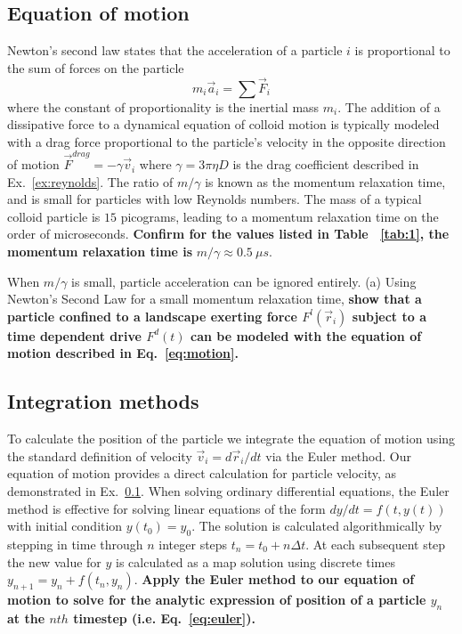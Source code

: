 \documentclass[twocolumn,showpacs,preprintnumbers,amsmath,amssymb,aps,prb]{revtex4}
\begin{document}
\label{ex:reynolds}

\subsection{Equation of motion}
  \label{ex:n2l}
  Newton's second law states that
  the acceleration of a particle $i$
  is proportional to 
  the sum of forces on the particle 
  \begin{equation}
  m_i \vec{a}_i = \sum \vec{F}_i
  \label{eq:n2l}
  \end{equation}
  where the constant of proportionality is the
  inertial mass $m_i$.  
  The addition of a dissipative force to a dynamical equation 
  of colloid motion 
  is typically modeled
  with a drag force proportional to the particle's velocity
  in the opposite direction of motion 
  $\vec{F}^{drag} = - \gamma \vec{v}_i$
  where $\gamma = 3 \pi \eta D$ is the drag coefficient
  described in Ex.~\ref{ex:reynolds}.
  The ratio of $m/\gamma$ is %
  known as the momentum relaxation time, %
  and is small for
  particles with low Reynolds numbers.
  The mass of a
  typical colloid particle is $15$ picograms,
  leading to a momentum relaxation time
  on the order of microseconds.
  {\bf Confirm for the values listed in Table ~\ref{tab:1},
  the momentum relaxation time is }
  $m/\gamma \approx 0.5 ~\mu s$. 
  
  When $m/\gamma$ is small,
  particle acceleration can be ignored
  entirely.
  (a) Using Newton's Second Law for
  a small momentum relaxation time, 
  {\bf show that a particle confined to a landscape exerting force
  $F^l(\vec{r}_i)$ subject to a time dependent drive $F^d(t)$
  can be modeled with the equation of motion described in 
  Eq.~\ref{eq:motion}. }

  \subsection{Integration methods}
  \label{ex:euler}
  To calculate the position of the particle we
  integrate the equation of motion using
  the standard definition of velocity
  $\vec{v}_i = d\vec{r}_i/dt$ 
  via the 
  Euler method. 
  Our equation of motion provides
  a direct calculation for particle velocity,
  as demonstrated in Ex.~\ref{ex:n2l}.  
  When solving ordinary differential equations,
  the Euler method is effective for solving linear equations
  of the form
  $dy/dt = f(t,y(t))$ with initial condition $y(t_0) = y_0$.
  The solution is calculated algorithmically
  by stepping in time through $n$ integer steps
  $t_n = t_0 + n \Delta t$.
  At each subsequent step the new
  value for $y$ is calculated as a map solution using
  discrete times 
  $y_{n+1} = y_n + f(t_n,y_n)$.
  {\bf Apply the Euler method to our equation
  of motion to solve for the analytic expression
  of position of a particle
  $y_n$ at the $nth$ timestep (i.e. Eq.~\ref{eq:euler}).}
    
\end{document}
